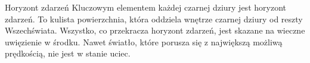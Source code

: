 \begin{frame}{Horyzont zdarzeń}
Kluczowym elementem każdej czarnej dziury jest horyzont zdarzeń. To kulista powierzchnia, która oddziela wnętrze czarnej dziury od reszty Wszechświata. Wszystko, co przekracza horyzont zdarzeń, jest skazane na wieczne uwięzienie w środku. Nawet światło, które porusza się z największą możliwą prędkością, nie jest w stanie uciec.
\end{frame}

